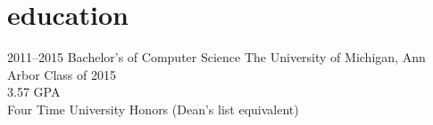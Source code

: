 \section{education}

\begin{entrylist}
\entry
{2011--2015}
{Bachelor's of Computer Science}
{The University of Michigan, Ann Arbor}
{Class of 2015 \\
	3.57 GPA \\
	Four Time University Honors (Dean's list equivalent)
}
\end{entrylist}
